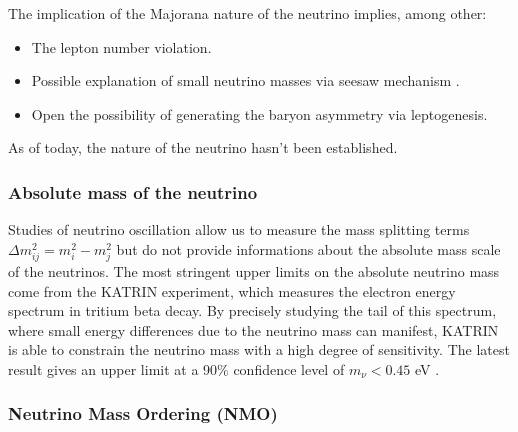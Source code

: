 The implication of the Majorana nature of the neutrino implies, among other:
\begin{itemize}
  \item The lepton number violation.

  \item Possible explanation of small neutrino masses via seesaw mechanism \cite{yanagida_horizontal_1980}.

  \item Open the possibility of generating the baryon asymmetry via leptogenesis.
\end{itemize}

As of today, the nature of the neutrino hasn't been established.

\subsubsection{Absolute mass of the neutrino}

Studies of neutrino oscillation allow us to measure the mass splitting terms $\Delta m^2_{ij} = m^2_{i} - m^2_{j}$ but do not provide informations about the absolute mass scale of the neutrinos.
The most stringent upper limits on the absolute neutrino mass come from the KATRIN experiment, which measures the electron energy spectrum in tritium beta decay. By precisely studying the tail of this spectrum, where small energy differences due to the neutrino mass can manifest, KATRIN is able to constrain the neutrino mass with a high degree of sensitivity. The latest result gives an upper limit at a 90\% confidence level of $m_\nu < 0.45$ eV \cite{aker_direct_2024}.

\subsubsection{Neutrino Mass Ordering (NMO)}

